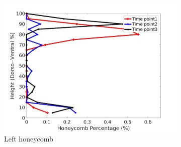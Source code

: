 \begin{figure}[H]
\begin{subfigure}{.4\linewidth}
  \includegraphics[width=\linewidth,trim={{.0\wd0} {.0\wd0} {.0\wd0} {.0\wd0}},clip]{Appendix/Image_AppexA/DorsoToVentral/IPF2LeftLungHoneycombDiseaseDorsoToVentral.jpg} %
  \caption{Left honeycomb}
  \label{fig:IPF2DiseaseDorsoToVentral-e} 
\end{subfigure} 
\begin{subfigure}{.4\linewidth}%

\end{subfigure}
\end{figure}
